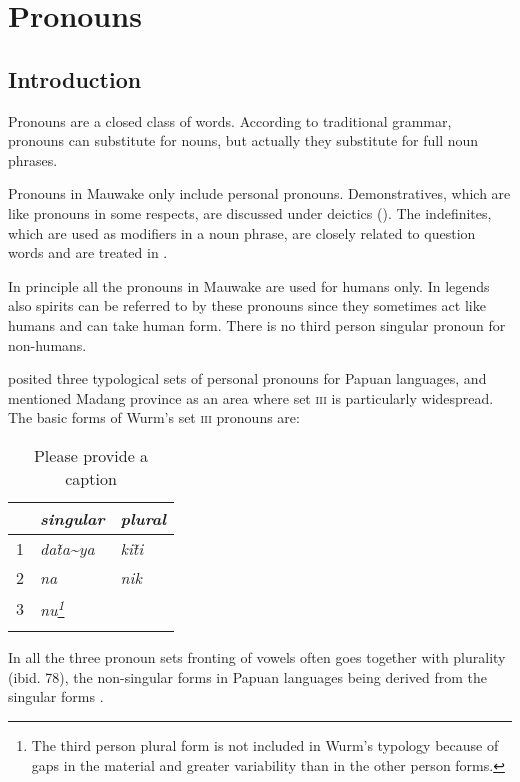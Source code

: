 \section{Pronouns}\label{sec:3.5}\footnotemark{}
{}
\subsection{Introduction}
{}
Pronouns are a closed class of words. According to traditional grammar, pronouns can substitute for nouns, but actually they substitute for full noun phrases. 

Pronouns in Mauwake only include personal pronouns. Demonstratives, which are like pronouns in some respects, are discussed under deictics (). The indefinites, which are used as modifiers in a noun phrase, are closely related to question words and are treated in .

In principle all the pronouns in Mauwake are used for humans only. In legends also spirits can be referred to by these pronouns since they sometimes act like humans and can take human form. There is no third person singular pronoun for non-humans. 

\citet{Wurm1982} posited three typological sets of personal pronouns for Papuan languages, and mentioned Madang province as an area where set \textsc{iii} is particularly widespread. The basic forms of Wurm's set \textsc{iii} pronouns are:

\begin{table}
\caption{Please provide a caption}
 
\begin{tabular}{l>{\itshape}l>{\itshape}l}
\mytoprule
 &\upshape singular &\upshape plural\\
\midrule
1 &da\~{ta\~{}ya} &ki\~{ti}\\
2 &na &nik\\
3 &nu\footnote{The third person plural form is not included in Wurm's typology because of gaps in the material and greater variability than in the other person forms.} &\citep[40--42]{Wurm1982}\\
\mybottomrule
\end{tabular}
\end{table}


In all the three pronoun sets fronting of vowels often goes together with plurality (ibid. 78), the non-singular forms in Papuan languages being derived from the singular forms \citep[361]{Franklin1979}. 

